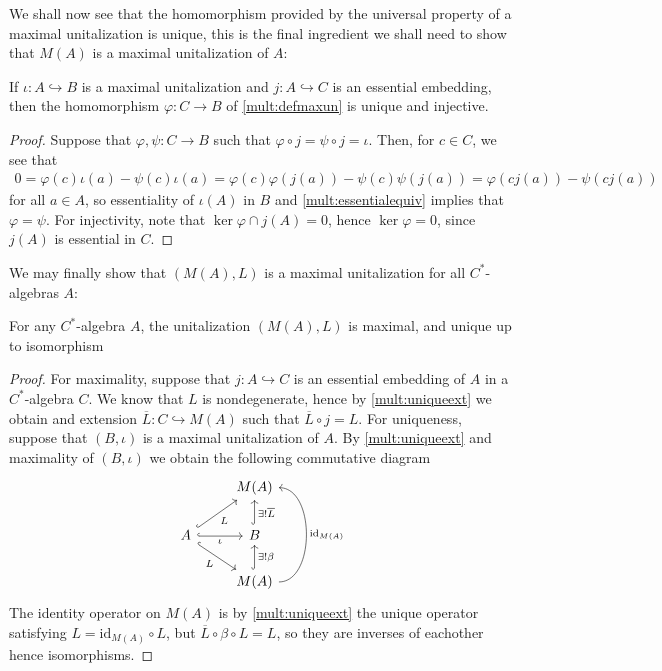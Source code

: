 We shall now see that the homomorphism provided by the universal property of a maximal unitalization is unique, this is the final ingredient we shall need to show that $M(A)$ is a maximal unitalization of $A$:
\begin{lemma}
	If $\iota \colon A \hookrightarrow B$ is a maximal unitalization and $j \colon A \hookrightarrow C$ is an essential embedding, then the homomorphism $\varphi \colon C \to B$ of \ref{mult:defmaxun} is unique and injective.
	\label{mult:uniquemax}
\end{lemma}
\begin{proof}
	Suppose that $\varphi, \psi \colon C \to B$ such that $\varphi \circ j = \psi \circ j = \iota$. Then, for $c \in C$, we see that
	\begin{align*}
		0 = \varphi(c) \iota(a) - \psi(c) \iota(a) = \varphi(c) \varphi( j(a)) - \psi(c) \psi( j(a)) =  \varphi(cj(a))-\psi(cj(a))
	\end{align*}
	for all $a \in A$, so essentiality of $\iota(A)$ in $B$ and \ref{mult:essentialequiv} implies that $\varphi = \psi$. For injectivity, note that $\ker \varphi \cap j(A) = 0$, hence $\ker \varphi = 0$, since $j(A)$ is essential in $C$.
\end{proof}
We may finally show that $(M(A),L)$ is a maximal unitalization for all $C^*$-algebras $A$:
\begin{theorem}
	For any $C^*$-algebra $A$, the unitalization $(M(A),L)$ is maximal, and unique up to isomorphism
	\label{mult:multmax}
\end{theorem}
\begin{proof}
	For maximality, suppose that $j \colon A \hookrightarrow C$ is an essential embedding of $A$ in a $C^*$-algebra $C$. We know that $L$ is nondegenerate, hence by \ref{mult:uniqueext} we obtain and extension $\overline{L} \colon C \hookrightarrow M(A)$ such that $\overline{L} \circ j = L$.
	For uniqueness, suppose that $(B,\iota)$ is a maximal unitalization of $A$. By \ref{mult:uniqueext} and maximality of $(B,\iota)$ we obtain the following commutative diagram
	\begin{equation}
		\begin{tikzcd}
	 		& M(A)\\
			A\arrow[rd, " L" ',hook] \arrow[r, "\iota"', hook] \arrow[ru, "L"', hook] & B \ar[u , "\exists !\overline L"', hook ]\\
			& M(A) \arrow[u, "\exists ! \beta"', hook] \ar[uu, "\mathrm{id}_{M(A)}"', bend right  = 90]
		\end{tikzcd}
	\end{equation}
	The identity operator on $M(A)$ is by \ref{mult:uniqueext} the unique operator satisfying $L = \mathrm{id}_{M(A)} \circ L$, but $\overline L \circ \beta \circ L = L$, so they are inverses of eachother hence isomorphisms.
\end{proof}

